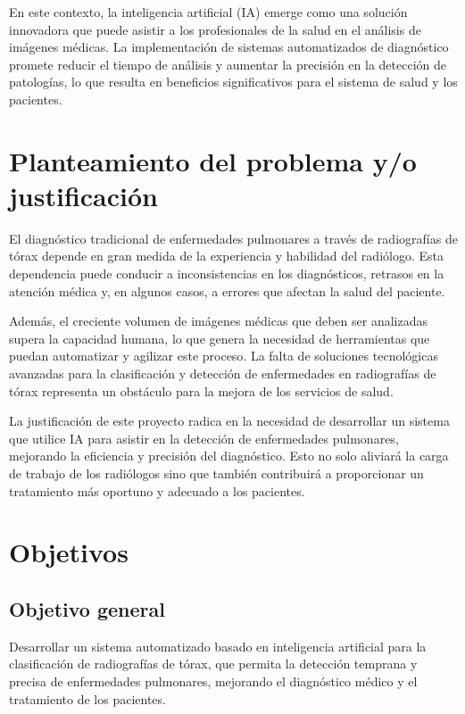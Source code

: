 \documentclass[conference]{IEEEtran}
\begin{document}
En este contexto, la inteligencia artificial (IA) emerge como una solución innovadora que puede asistir a los profesionales de la salud en el análisis de imágenes médicas. La implementación de sistemas automatizados de diagnóstico promete reducir el tiempo de análisis y aumentar la precisión en la detección de patologías, lo que resulta en beneficios significativos para el sistema de salud y los pacientes.

\section{Planteamiento del problema y/o justificación}
El diagnóstico tradicional de enfermedades pulmonares a través de radiografías de tórax depende en gran medida de la experiencia y habilidad del radiólogo. Esta dependencia puede conducir a inconsistencias en los diagnósticos, retrasos en la atención médica y, en algunos casos, a errores que afectan la salud del paciente.

Además, el creciente volumen de imágenes médicas que deben ser analizadas supera la capacidad humana, lo que genera la necesidad de herramientas que puedan automatizar y agilizar este proceso. La falta de soluciones tecnológicas avanzadas para la clasificación y detección de enfermedades en radiografías de tórax representa un obstáculo para la mejora de los servicios de salud.

La justificación de este proyecto radica en la necesidad de desarrollar un sistema que utilice IA para asistir en la detección de enfermedades pulmonares, mejorando la eficiencia y precisión del diagnóstico. Esto no solo aliviará la carga de trabajo de los radiólogos sino que también contribuirá a proporcionar un tratamiento más oportuno y adecuado a los pacientes.

\section{Objetivos}

\subsection{Objetivo general}
Desarrollar un sistema automatizado basado en inteligencia artificial para la clasificación de radiografías de tórax, que permita la detección temprana y precisa de enfermedades pulmonares, mejorando el diagnóstico médico y el tratamiento de los pacientes.
\end{document}
